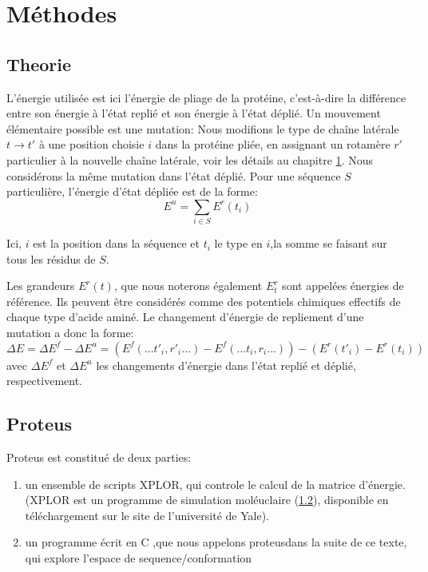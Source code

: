 \chapter{Méthodes}
\label{chap:methodes}

\section{Theorie}
\label{sec:theo}
L'énergie utilisée est ici l'énergie de pliage de la protéine, c'est-à-dire la différence entre
son énergie à l'état replié et son énergie à l'état déplié. Un mouvement élémentaire possible est une \og mutation\fg:
Nous modifions le type de chaîne latérale $t \rightarrow t'$ à une position choisie $i$ dans la protéine pliée, en assignant
un rotamère $r'$ particulier à la nouvelle chaîne latérale, voir les détails au chapitre \ref{chap:methodes}. Nous considérons la même mutation dans
l'état déplié. Pour une séquence $S$ particulière, l'énergie d'état dépliée est de la forme:
\begin{equation}
  E^u=\sum_{i\in S}E^r(t_i)
  \label{eq:unfolded}
\end{equation} 

Ici, $i$ est la position dans la séquence et $t_i$ le type en $i$,la somme se faisant sur tous les résidus de $S$.

Les grandeurs $E^r(t)$, que nous noterons également $E_t^r$ sont appelées \og énergies de référence\fg. Ils peuvent être considérés comme des potentiels chimiques effectifs de chaque type d'acide aminé. Le changement d'énergie de repliement d'une mutation a donc la forme:
\begin{equation} \label{eq:deltaE}
  \Delta E=\Delta E^f - \Delta E^u=(E^f(...t'_i,r'_i...) - E^f(...t_i,r_i...)) -(E^r(t'_i) - E^r(t_i))
\end{equation} 
avec $\Delta E^f$ et  $\Delta E^u$ les changements d'énergie dans l'état replié et déplié, respectivement.



\section{Proteus}


Proteus est constitué de deux parties:

\begin{enumerate}
\item un ensemble de scripts XPLOR, qui controle le calcul de la matrice d'énergie. (XPLOR est un programme de simulation moléuclaire (\ref{}), disponible en téléchargement sur le site de l'université de Yale).
\item un programme écrit en C ,que nous appelons \og proteus\fg dans la suite de ce texte, qui explore l'espace de sequence/conformation
\end{enumerate}

